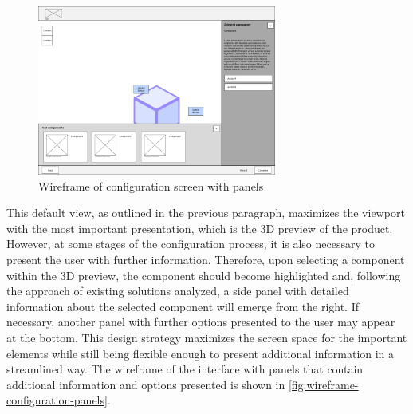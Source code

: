 \begin{figure}[h]
\centering
\includegraphics[width=0.7\textwidth]{images/wireframe_configuration_panels.png}
\caption{Wireframe of configuration screen with panels}
\label{fig:wireframe-configuration-panels}
\end{figure}

This default view, as outlined in the previous paragraph, maximizes the viewport with the most important presentation, which is the 3D preview of the product. However, at some stages of the configuration process, it is also necessary to present the user with further information. Therefore, upon selecting a component within the 3D preview, the component should become highlighted and, following the approach of existing solutions analyzed, a side panel with detailed information about the selected component will emerge from the right. If necessary, another panel with further options presented to the user may appear at the bottom. This design strategy maximizes the screen space for the important elements while still being flexible enough to present additional information in a streamlined way. The wireframe of the interface with panels that contain additional information and options presented is shown in \autoref{fig:wireframe-configuration-panels}.

